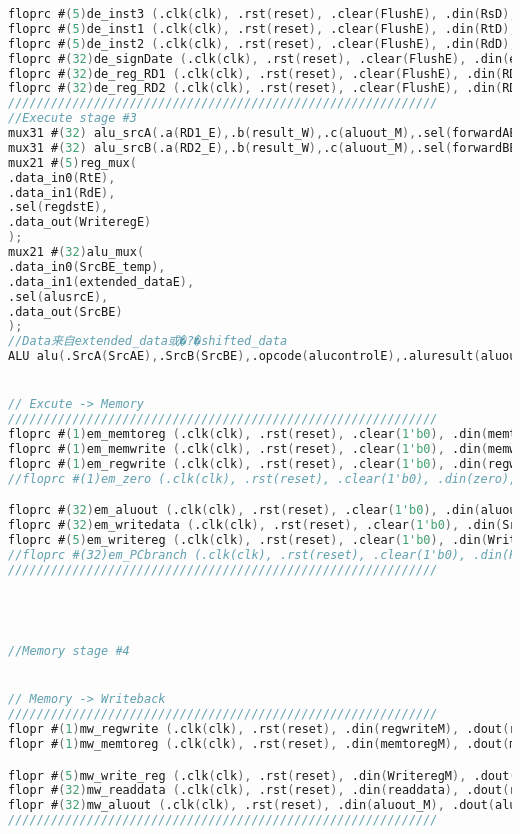 \begin{lstlisting}[language=Verilog,frame=single]
floprc #(5)de_inst3 (.clk(clk), .rst(reset), .clear(FlushE), .din(RsD), .dout(RsE));
floprc #(5)de_inst1 (.clk(clk), .rst(reset), .clear(FlushE), .din(RtD), .dout(RtE));
floprc #(5)de_inst2 (.clk(clk), .rst(reset), .clear(FlushE), .din(RdD), .dout(RdE));
floprc #(32)de_signDate (.clk(clk), .rst(reset), .clear(FlushE), .din(extended_dataD), .dout(extended_dataE));
floprc #(32)de_reg_RD1 (.clk(clk), .rst(reset), .clear(FlushE), .din(RD1), .dout(RD1_E));
floprc #(32)de_reg_RD2 (.clk(clk), .rst(reset), .clear(FlushE), .din(RD2), .dout(RD2_E));
////////////////////////////////////////////////////////////
//Execute stage #3
mux31 #(32) alu_srcA(.a(RD1_E),.b(result_W),.c(aluout_M),.sel(forwardAE),.out(SrcAE));
mux31 #(32) alu_srcB(.a(RD2_E),.b(result_W),.c(aluout_M),.sel(forwardBE),.out(SrcBE_temp));
mux21 #(5)reg_mux(
.data_in0(RtE),
.data_in1(RdE),
.sel(regdstE),
.data_out(WriteregE)
);
mux21 #(32)alu_mux(
.data_in0(SrcBE_temp),
.data_in1(extended_dataE),
.sel(alusrcE),
.data_out(SrcBE)
);
//Data来自extended_data或�?�shifted_data
ALU alu(.SrcA(SrcAE),.SrcB(SrcBE),.opcode(alucontrolE),.aluresult(aluoutE));


// Excute -> Memory 
////////////////////////////////////////////////////////////
floprc #(1)em_memtoreg (.clk(clk), .rst(reset), .clear(1'b0), .din(memtoregE), .dout(memtoregM));
floprc #(1)em_memwrite (.clk(clk), .rst(reset), .clear(1'b0), .din(memwriteE), .dout(memwriteM));
floprc #(1)em_regwrite (.clk(clk), .rst(reset), .clear(1'b0), .din(regwriteE), .dout(regwriteM));
//floprc #(1)em_zero (.clk(clk), .rst(reset), .clear(1'b0), .din(zero), .dout(zero_M));

floprc #(32)em_aluout (.clk(clk), .rst(reset), .clear(1'b0), .din(aluoutE), .dout(aluout_M));
floprc #(32)em_writedata (.clk(clk), .rst(reset), .clear(1'b0), .din(SrcBE_temp), .dout(Writedata_M));
floprc #(5)em_writereg (.clk(clk), .rst(reset), .clear(1'b0), .din(WriteregE), .dout(WriteregM));
//floprc #(32)em_PCbranch (.clk(clk), .rst(reset), .clear(1'b0), .din(PCbranch), .dout(PCbranch_M));
////////////////////////////////////////////////////////////




//Memory stage #4


// Memory -> Writeback
////////////////////////////////////////////////////////////
flopr #(1)mw_regwrite (.clk(clk), .rst(reset), .din(regwriteM), .dout(regwriteW));
flopr #(1)mw_memtoreg (.clk(clk), .rst(reset), .din(memtoregM), .dout(memtoregW));

flopr #(5)mw_write_reg (.clk(clk), .rst(reset), .din(WriteregM), .dout(WriteregW));
flopr #(32)mw_readdata (.clk(clk), .rst(reset), .din(readdata), .dout(readdata_W));
flopr #(32)mw_aluout (.clk(clk), .rst(reset), .din(aluout_M), .dout(aluout_W));
////////////////////////////////////////////////////////////


\end{lstlisting}
